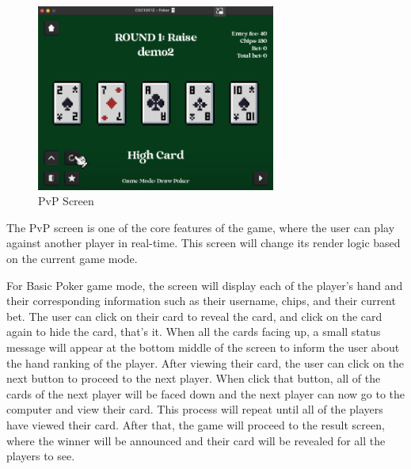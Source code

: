\begin{figure}[H]
    \centering
    \includegraphics[width=0.7\textwidth]{figures/pvp_screen.png}
    \caption{PvP Screen}
    \label{fig:pvp-screen}
\end{figure}

\hspace{1cm} The PvP screen is one of the core features of the game, where the user can play against another player in real-time. This screen will change its render logic based on the current game mode.

\vspace{0.5cm}

\hspace{1cm} For Basic Poker game mode, the screen will display each of the player's hand and their corresponding information such as their username, chips, and their current bet. The user can click on their card to reveal the card, and click on the card again to hide the card, that's it. When all the cards facing up, a small status message will appear at the bottom middle of the screen to inform the user about the hand ranking of the player. After viewing their card, the user can click on the next button to proceed to the next player. When click that button, all of the cards of the next player will be faced down and the next player can now go to the computer and view their card. This process will repeat until all of the players have viewed their card. After that, the game will proceed to the result screen, where the winner will be announced and their card will be revealed for all the players to see.

\vspace{0.5cm}

